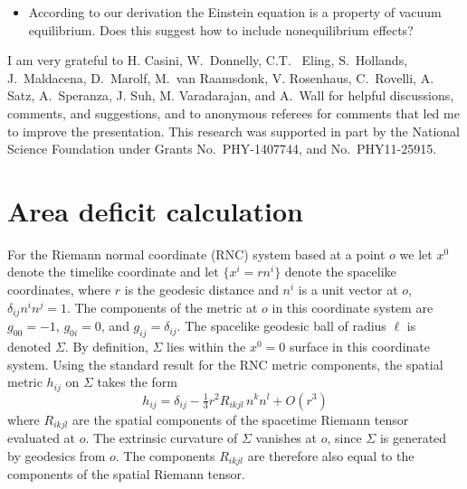 \documentclass[aps,prd,twocolumn,showpacs,groupedaddress,nofootinbib,longbibliography]{revtex4-1}
\def\beq{\begin{equation}}
\def\eeq{\end{equation}}
\def\d{\delta}\def\D{\Delta}
\begin{document}
\begin{itemize}

\item According to our derivation the Einstein equation is a property of vacuum equilibrium. 
Does this suggest how to include nonequilibrium effects? 

\end{itemize}

\vspace{3mm}
\acknowledgments

I am very grateful to H. Casini, W.~Donnelly, C.T.~ Eling, S.~Hollands, J.~Maldacena, D.~Marolf, M.~van Raamsdonk, V. Rosenhaus, C.~Rovelli, A. Satz, A.~Speranza, J. Suh, M. Varadarajan, and A.~Wall for helpful discussions, comments, and suggestions, and to anonymous referees for comments that led me to improve the presentation. This research was supported in part by the National Science Foundation under Grants No.\ PHY-1407744, and No.\ PHY11-25915.

\appendix

\section{Area deficit calculation}
\label{AppA}


For the Riemann normal coordinate (RNC) system based at a point $o$
we let $x^0$ denote the timelike coordinate and let $\{x^i=r n^i\}$ denote the 
spacelike coordinates, where $r$ is the geodesic distance and $n^i$ is a unit vector at $o$, 
$\d_{ij}n^i n^j=1$. The components of the metric at $o$ in this coordinate system are
$g_{00}=-1$, $g_{0i}=0$, and $g_{ij}=\d_{ij}$.  The spacelike geodesic ball of radius 
$\ell$ is denoted $\Sigma$. 
By definition, $\Sigma$ lies within the $x^0=0$ surface in this coordinate system. 
Using the standard result for the RNC metric components, 
the spatial metric $h_{ij}$ on $\Sigma$ takes the form 
%
\beq\label{metric}
h_{ij} = \d_{ij} -\tfrac{1}{3} r^2 R_{ikjl}\,n^k n^l + O(r^3)
\eeq
%
where $R_{ikjl}$ are the spatial components of the spacetime Riemann tensor evaluated at $o$.
The extrinsic curvature of $\Sigma$ vanishes at $o$, 
since $\Sigma$ is generated by geodesics from $o$. The components $R_{ikjl}$ are therefore 
also equal to the components of the spatial Riemann tensor. 
\end{document}
